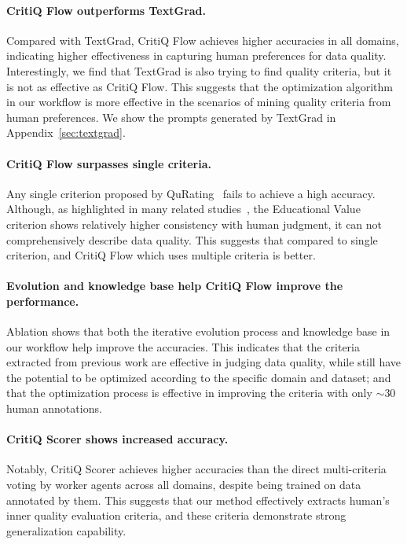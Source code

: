 \paragraph{CritiQ Flow outperforms TextGrad.}
Compared with TextGrad, CritiQ Flow achieves higher accuracies in all domains,
indicating higher effectiveness in capturing human preferences for data quality.
Interestingly, we find that TextGrad is also trying to find quality criteria, but
it is not as effective as CritiQ Flow. This suggests that the optimization
algorithm in our workflow is more effective in the scenarios of mining quality
criteria from human preferences. We show the prompts generated by TextGrad in Appendix~\ref{sec:textgrad}.

\paragraph{CritiQ Flow surpasses single criteria.}
Any single criterion proposed by QuRating~\citep{wettig_qurating_2024} fails to achieve
a high accuracy. Although, as highlighted in many related studies~\citep{zhang_autonomous_2024,gunasekar_textbooks_2023,wei_arctic-snowcoder_2024},
the Educational Value criterion shows relatively higher consistency with human judgment,
it can not comprehensively describe data quality. This suggests that compared to
single criterion, and CritiQ Flow which uses multiple criteria is better.

\paragraph{Evolution and knowledge base help CritiQ Flow improve the
performance.}
Ablation shows that both the iterative evolution process and knowledge base in our
workflow help improve the accuracies. This indicates that the criteria extracted
from previous work are effective in judging data quality, while still have the potential
to be optimized according to the specific domain and dataset; and that the
optimization process is effective in improving the criteria with only $\sim$30 human annotations.

\paragraph{CritiQ Scorer shows increased accuracy.}
Notably, CritiQ Scorer achieves higher accuracies than the direct multi-criteria
voting by worker agents across all domains, despite being trained on data
annotated by them. This suggests that our method effectively extracts human's inner
quality evaluation criteria, and these criteria demonstrate strong generalization
capability.

